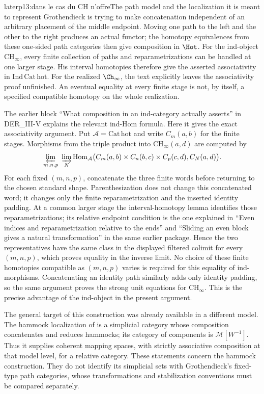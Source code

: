 \begin{dcomment}{later}{p13:dans le cas du CH n'offre}{The path model and the localization it is meant to represent}
Grothendieck is trying to make concatenation independent of an arbitrary placement of the middle endpoint. Moving one path to the left and the other to the right produces an actual functor; the homotopy equivalences from these one-sided path categories then give composition in $\Hot$. For the ind-object $\mathrm{CH}_\infty$, every finite collection of paths and reparametrizations can be handled at one larger stage. His interval homotopies therefore give the asserted associativity in $\mathrm{Ind\,Cat\,hot}$. For the realized $\Ch_\infty$, the text explicitly leaves the associativity proof unfinished. An eventual equality at every finite stage is not, by itself, a specified compatible homotopy on the whole realization.

The earlier block ``What composition in an ind-category actually asserts'' in DER\_III-V explains the relevant ind-Hom formula. Here it gives the exact associativity argument. Put $\mathcal A=\mathrm{Cat\,hot}$ and write $C_m(a,b)$ for the finite stages. Morphisms from the triple product into $\mathrm{CH}_\infty(a,d)$ are computed by
\[
 \varprojlim_{m,n,p}\ \varinjlim_N
 \operatorname{Hom}_{\mathcal A}\bigl(
 C_m(a,b)\times C_n(b,c)\times C_p(c,d),C_N(a,d)\bigr).
\]
For each fixed $(m,n,p)$, concatenate the three finite words before returning to the chosen standard shape. Parenthesization does not change this concatenated word; it changes only the finite reparametrization and the inserted identity padding. At a common larger stage the interval-homotopy lemma identifies those reparametrizations; its relative endpoint condition is the one explained in ``Even indices and reparametrization relative to the ends'' and ``Sliding an even block gives a natural transformation'' in the same earlier package. Hence the two representatives have the same class in the displayed filtered colimit for every $(m,n,p)$, which proves equality in the inverse limit. No choice of these finite homotopies compatible as $(m,n,p)$ varies is required for this equality of ind-morphisms. Concatenating an identity path similarly adds only identity padding, so the same argument proves the strong unit equations for $\mathrm{CH}_\infty$. This is the precise advantage of the ind-object in the present argument.

The general target of this construction was already available in a different model. The hammock localization of \citet[\S2; Propositions 2.2 and 3.1]{DwyerKan1980Calculating} is a simplicial category whose composition concatenates and reduces hammocks; its category of components is $\mathcal M[W^{-1}]$. Thus it supplies coherent mapping spaces, with strictly associative composition at that model level, for a relative category. These statements concern the hammock construction. They do not identify its simplicial sets with Grothendieck's fixed-type path categories, whose transformations and stabilization conventions must be compared separately.


\end{dcomment}
